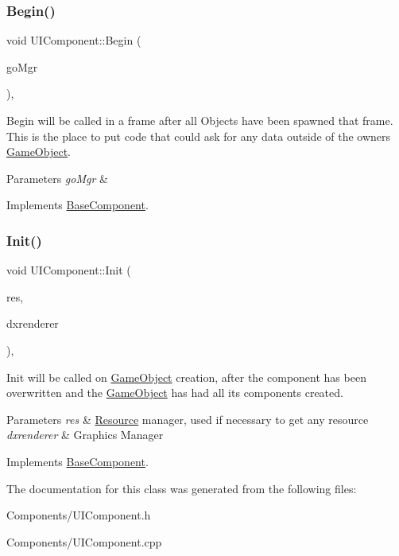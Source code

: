 \subsubsection{\texorpdfstring{Begin()}{Begin()}}
{\footnotesize\ttfamily void U\+I\+Component\+::\+Begin (\begin{DoxyParamCaption}\item[{\hyperlink{classGameObjectManager}{Game\+Object\+Manager} $\ast$}]{go\+Mgr }\end{DoxyParamCaption})\hspace{0.3cm}{\ttfamily [override]}, {\ttfamily [virtual]}}



Begin will be called in a frame after all Objects have been spawned that frame. This is the place to put code that could ask for any data outside of the owner\textquotesingle{}s \hyperlink{classGameObject}{Game\+Object}. 


\begin{DoxyParams}{Parameters}
{\em go\+Mgr} & \\
\hline
\end{DoxyParams}


Implements \hyperlink{classBaseComponent}{Base\+Component}.

\mbox{\label{classUIComponent_ab4632b919bcdf5954cbee5c32b01a38d}} 
\subsubsection{\texorpdfstring{Init()}{Init()}}
{\footnotesize\ttfamily void U\+I\+Component\+::\+Init (\begin{DoxyParamCaption}\item[{\hyperlink{classResourceManager}{Resource\+Manager} $\ast$}]{res,  }\item[{\hyperlink{classDXRenderer}{D\+X\+Renderer} $\ast$}]{dxrenderer }\end{DoxyParamCaption})\hspace{0.3cm}{\ttfamily [override]}, {\ttfamily [virtual]}}



Init will be called on \hyperlink{classGameObject}{Game\+Object} creation, after the component has been overwritten and the \hyperlink{classGameObject}{Game\+Object} has had all its components created. 


\begin{DoxyParams}{Parameters}
{\em res} & \hyperlink{structResource}{Resource} manager, used if necessary to get any resource \\
\hline
{\em dxrenderer} & Graphic\textquotesingle{}s Manager \\
\hline
\end{DoxyParams}


Implements \hyperlink{classBaseComponent}{Base\+Component}.



The documentation for this class was generated from the following files\+:\begin{DoxyCompactItemize}
\item 
Components/U\+I\+Component.\+h\item 
Components/U\+I\+Component.\+cpp\end{DoxyCompactItemize}
